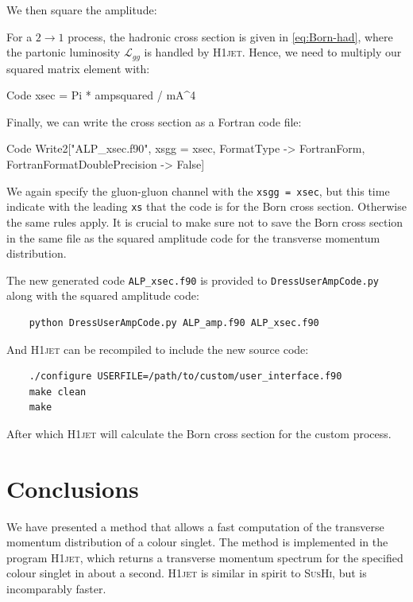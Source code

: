 \documentclass[12pt]{article}
\begin{document}
We then square the amplitude: 
For a $2 \rightarrow 1$ process, the hadronic cross section is given in \autoref{eq:Born-had}, where the partonic luminosity $\mathcal{L}_{gg}$ is handled by \textsc{H1jet}. Hence, we need to multiply our squared matrix element with:
\begin{mmaCell}{Code}
xsec = Pi * ampsquared / mA^4 
\end{mmaCell}
Finally, we can write the cross section as a Fortran code file: 
\begin{mmaCell}{Code}
Write2["ALP_xsec.f90", xsgg = xsec, FormatType -> FortranForm, FortranFormatDoublePrecision -> False] 
\end{mmaCell}
We again specify the gluon-gluon channel with the \texttt{xsgg = xsec}, but this time indicate with the leading \texttt{xs} that the code is for the Born cross section. Otherwise the same rules apply. It is crucial to make sure not to save the Born cross section in the same file as the squared amplitude code for the transverse momentum distribution. 

The new generated code \texttt{ALP\_xsec.f90} is provided to \texttt{DressUserAmpCode.py} along with the squared amplitude code: 
\begin{lstlisting}
	python DressUserAmpCode.py ALP_amp.f90 ALP_xsec.f90 
\end{lstlisting}
And \textsc{H1jet} can be recompiled to include the new source code: 
\begin{lstlisting}
	./configure USERFILE=/path/to/custom/user_interface.f90 
	make clean
	make 
\end{lstlisting}
After which \textsc{H1jet} will calculate the Born cross section for the custom process. 

\section{Conclusions}
\label{sec:the-end}

We have presented a method that allows a fast computation of the
transverse momentum distribution of a colour singlet. The method is
implemented in the program \textsc{H1jet}, which returns a transverse momentum
spectrum for the specified colour singlet in about a second. \textsc{H1jet} is
similar in spirit to \textsc{SusHi}, but is incomparably faster.
\end{document}
